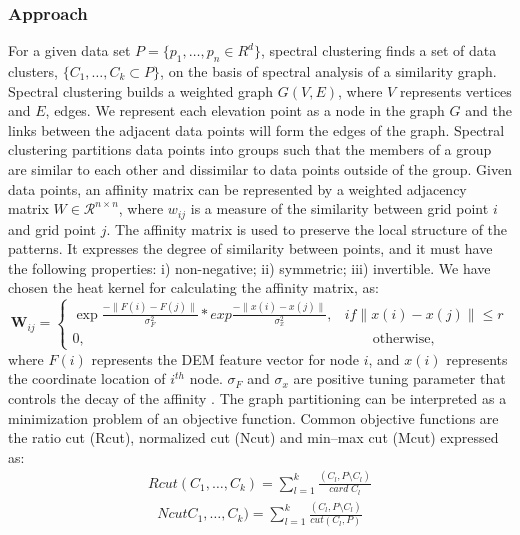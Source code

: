 \documentclass[12pt,letterpaper]{article}
\begin{document}
\subsubsection{Approach}
For a given data set $P = \{ p_1,\dots, p_n \in R^d \}$, spectral clustering finds a set of data clusters, $\{C_1,\dots, C_k \subset P\}$,
on the basis of spectral analysis of a similarity graph. Spectral clustering builds a weighted graph $G(V,E)$, where $V$ represents vertices and $E$, edges. 
We represent each elevation point as a node in the graph $G$ and the links between the adjacent data points will form the edges of the graph. Spectral clustering partitions data points into groups such that the members of a group are similar to each other and dissimilar to data points outside of the group. Given data points, an affinity matrix can be represented by a weighted adjacency matrix $W \in \mathcal{R}^{n\times n}$, where $w_{ij}$ is a measure
of the similarity between grid point $i$ and grid point $j$. The affinity matrix is used to preserve the local structure of the patterns. It expresses the degree of similarity between points, and
it must have the following properties: i) non-negative; ii) symmetric; iii) invertible.
We have chosen the heat kernel for calculating the affinity matrix, as:
\begin{equation}
{\mathbf W_{ij}} = \left\{
\begin{array}{rl}
\exp{\frac{- \parallel F(i) - F(j) \parallel}{\sigma_F^2}}*exp{\frac{- \parallel x(i) - x(j) \parallel}{\sigma_x^2}}, & if \parallel x(i) - x(j) \parallel \le r\\
0, & \qquad \text{otherwise},
\end{array} 
\right.
\label{eq:eq1}
\end{equation} 
where $F(i)$ represents the DEM feature vector for node $i$, and $x(i)$ represents the coordinate location of $i^{th}$ node.
$\sigma_F $ and $\sigma_x$ are positive tuning parameter that controls the decay of the affinity \citep{Tung2010}.
The graph partitioning can be interpreted as a minimization problem of an objective function. Common objective functions are
the ratio cut (Rcut), normalized cut (Ncut) and min--max cut (Mcut) expressed as:
\begin{align}
Rcut (C_1,\dots,C_k) = \sum_{l=1}^k \frac{(C_l, P \setminus C_l)}{card\; C_l} 
\label{eq2}
\end{align}
\begin{align}
Ncut C_1,\dots,C_k) = \sum_{l=1}^k \frac{(C_l, P \setminus C_l)}{cut (C_l, P)}
\label{eq3}
\end{align}
\end{document}
